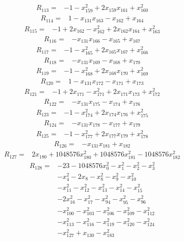 \begin{align*} R_{113}={}&-1 -x_{159}^{2} +2 x_{159}x_{161} +x_{160}^{2}
\end{align*}
\begin{align*} R_{114}={}&1 -x_{131}x_{163} -x_{162} +x_{164}
\end{align*}
\begin{align*} R_{115}={}&-1 +2 x_{162} -x_{162}^{2} +2 x_{162}x_{164} +x_{163}^{2}
\end{align*}
\begin{align*} R_{116}={}&-x_{131}x_{166} -x_{165} +x_{167}
\end{align*}
\begin{align*} R_{117}={}&-1 -x_{165}^{2} +2 x_{165}x_{167} +x_{166}^{2}
\end{align*}
\begin{align*} R_{118}={}&-x_{131}x_{169} -x_{168} +x_{170}
\end{align*}
\begin{align*} R_{119}={}&-1 -x_{168}^{2} +2 x_{168}x_{170} +x_{169}^{2}
\end{align*}
\begin{align*} R_{120}={}&1 -x_{131}x_{172} -x_{171} +x_{173}
\end{align*}
\begin{align*} R_{121}={}&-1 +2 x_{171} -x_{171}^{2} +2 x_{171}x_{173} +x_{172}^{2}
\end{align*}
\begin{align*} R_{122}={}&-x_{131}x_{175} -x_{174} +x_{176}
\end{align*}
\begin{align*} R_{123}={}&-1 -x_{174}^{2} +2 x_{174}x_{176} +x_{175}^{2}
\end{align*}
\begin{align*} R_{124}={}&-x_{131}x_{178} -x_{177} +x_{179}
\end{align*}
\begin{align*} R_{125}={}&-1 -x_{177}^{2} +2 x_{177}x_{179} +x_{178}^{2}
\end{align*}
\begin{align*} R_{126}={}&-x_{131}x_{181} +x_{182}
\end{align*}
\begin{align*} R_{127}={}&2 x_{180} +1048576 x_{180}^{2} +1048576 x_{181}^{2} -1048576 x_{182}^{2}
\end{align*}
\begin{align*} R_{128}={}&-23 -1048576 x_{0}^{2} -x_{1}^{2} -x_{2}^{2} -x_{3}^{2}
\\ &-x_{4}^{2} -2 x_{8} -x_{8}^{2} -x_{9}^{2} -x_{10}^{2}
\\ &-x_{11}^{2} -x_{12}^{2} -x_{13}^{2} -x_{14}^{2} -x_{15}^{2}
\\ &-2 x_{16}^{2} -x_{17}^{2} -x_{94}^{2} -x_{95}^{2} -x_{96}^{2}
\\ &-x_{100}^{2} -x_{103}^{2} -x_{106}^{2} -x_{109}^{2} -x_{112}^{2}
\\ &-x_{113}^{2} -x_{116}^{2} -x_{119}^{2} -x_{120}^{2} -x_{124}^{2}
\\ &-x_{127}^{2} +x_{130} -x_{183}^{2}
\end{align*}
